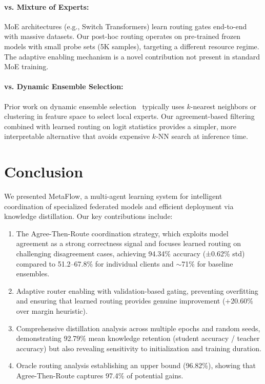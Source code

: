 \documentclass[12pt]{article}
\begin{document}
\paragraph{vs. Mixture of Experts:}
MoE architectures (e.g., Switch Transformers) learn routing gates end-to-end with massive datasets. Our post-hoc routing operates on pre-trained frozen models with small probe sets (5K samples), targeting a different resource regime. The adaptive enabling mechanism is a novel contribution not present in standard MoE training.

\paragraph{vs. Dynamic Ensemble Selection:}
Prior work on dynamic ensemble selection~\cite{cruz2018dynamic} typically uses $k$-nearest neighbors or clustering in feature space to select local experts. Our agreement-based filtering combined with learned routing on logit statistics provides a simpler, more interpretable alternative that avoids expensive $k$-NN search at inference time.

\section{Conclusion}
\label{sec:conclusion}

We presented MetaFlow, a multi-agent learning system for intelligent coordination of specialized federated models and efficient deployment via knowledge distillation. Our key contributions include:

\begin{enumerate}
    \item The Agree-Then-Route coordination strategy, which exploits model agreement as a strong correctness signal and focuses learned routing on challenging disagreement cases, achieving 94.34\% accuracy (±0.62\% std) compared to 51.2--67.8\% for individual clients and $\sim$71\% for baseline ensembles.
    
    \item Adaptive router enabling with validation-based gating, preventing overfitting and ensuring that learned routing provides genuine improvement (+20.60\% over margin heuristic).
    
    \item Comprehensive distillation analysis across multiple epochs and random seeds, demonstrating 92.79\% mean knowledge retention (student accuracy / teacher accuracy) but also revealing sensitivity to initialization and training duration.
    
    \item Oracle routing analysis establishing an upper bound (96.82\%), showing that Agree-Then-Route captures 97.4\% of potential gains.
\end{enumerate}
\end{document}
